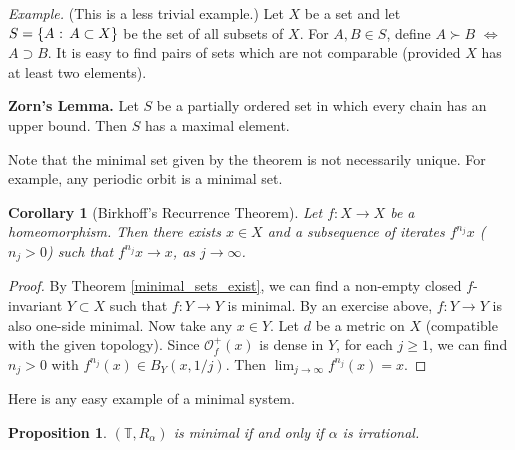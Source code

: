 \documentclass[12pt]{article}
\newtheorem{corollary}[theorem]{Corollary}
\newtheorem{proposition}[theorem]{Proposition}
\theoremstyle{definition}
\theoremstyle{remark}
\begin{document}
\medskip
\noindent
{\it Example.} (This is a less trivial example.)
Let $X$ be a set and let $S =\{A \hbox{ : } A \subset X\}$ be the set
of all subsets of $X$. For $A,B \in S$, define
$A \succ B$ $\iff$ $A \supset B$.
It is easy to find pairs of sets which are not comparable (provided
$X$ has at least two elements).






\medskip
\noindent
{\bf Zorn's Lemma.}
Let $S$ be a partially ordered set in which every chain has an upper
bound.
Then $S$ has a maximal element.
%

\medskip

Note that the minimal set given by the theorem is not necessarily unique. For example, any periodic orbit is a
minimal set.

\begin{corollary}[Birkhoff's Recurrence Theorem] \label{birkhoff_rec_th}
Let $f : X \to X$ be a homeomorphism. Then there exists $x \in X$ and a subsequence 
of iterates $f^{n_j}x$ ($n_j>0$)
such that 
$f^{n_j}x \to x$, as $j \to \infty$.
\end{corollary}

\begin{proof}
By Theorem \ref{minimal_sets_exist}, we can find a non-empty closed $f$-invariant $Y \subset X$ such that 
$f : Y \to Y$ is minimal. By an exercise above, $f : Y \to Y$ is also one-side minimal.
Now take any $x \in Y$. Let $d$ be a metric on $X$ (compatible with the given topology).
Since $\mathcal O_f^+(x)$ is dense in $Y$, for each $j \ge 1$, we can find $n_j>0$
with $f^{n_j}(x) \in B_Y(x,1/j)$. Then $\lim_{j \to \infty} f^{n_j}(x) =x$. 
\end{proof}

Here is any easy example of a minimal system.

\begin{proposition}
$(\mathbb T,R_\alpha)$ is minimal if and only if $\alpha$ is irrational.
\end{proposition}
\end{document}
